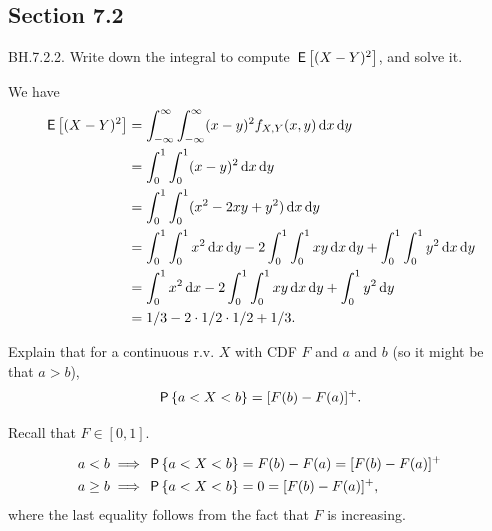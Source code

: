 \subsection*{Section 7.2}
\label{sec:section-7.2}


\begin{exercise}
BH.7.2.2. Write down the integral to compute $\E{(X-Y)^{2}}$, and solve it.
\begin{solution}
We have
\begin{align}
    \E{(X-Y)^2} &= \int_{-\infty}^\infty \int_{-\infty}^\infty (x - y)^2 f_{X,Y}(x,y) \d x \d y \\
    &=\int_0^1 \int_0^1 (x - y)^2 \d x \d y \\
    &=\int_0^1 \int_0^1 (x^{2} - 2 x y +  y^2) \d x \d y \\
    &=\int_0^1 \int_0^1 x^{2} \d x \d y
    -2\int_0^1 \int_0^1  x y  \d x \d y
    +\int_0^1 \int_0^1  y^2 \d x \d y  \\
    &=\int_0^1 x^{2} \d x
    -2\int_0^1 \int_0^1 x y  \d x \d y
    + \int_0^1  y^2  \d y \\
    &=1/3  -2 \cdot 1/ 2 \cdot 1/ 2 + 1/3.
\end{align}
\end{solution}
\end{exercise}


\begin{exercise}
Explain that for a continuous r.v. $X$ with CDF $F$ and $a$ and $b$ (so it might be that $a>b$),
\begin{equation}
  \label{eq:87}
\P{a< X < b} = [F(b) - F(a)]^{+}.
\end{equation}
\begin{hint}
  Recall that $F\in [0, 1]$.
\end{hint}
\begin{solution}
\begin{align}
a<b & \implies \P{a< X < b} = F(b) - F(a) = [F(b) - F(a)]^{+} \\
a\geq b & \implies \P{a< X < b} =  0 = [F(b) - F(a)]^{+},
\end{align}
where the last equality follows from the fact that $F$ is increasing.
\end{solution}
\end{exercise}

